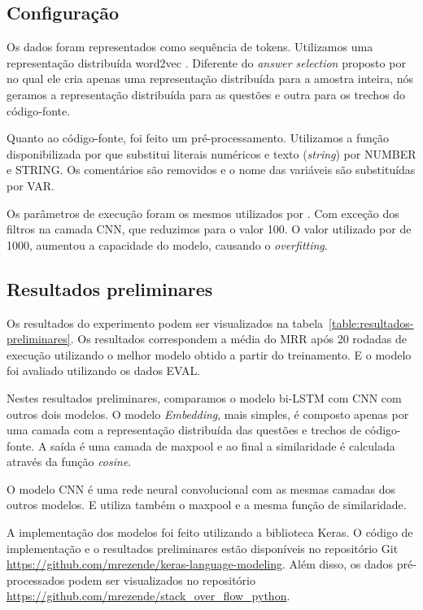 \documentclass[12pt]{article}
\begin{document}
\subsection{Configuração}

Os dados foram representados como sequência de tokens. Utilizamos uma representação distribuída word2vec \cite{mikolov-word2vec-2013}. Diferente do \textit{answer selection} proposto por \cite{tan-lstm-qa} no qual ele cria apenas uma representação distribuída para a amostra inteira, nós geramos a representação distribuída para as questões e outra para os trechos do código-fonte.

Quanto ao código-fonte, foi feito um pré-processamento. Utilizamos a função disponibilizada por \cite{Yao-staqc:2018} que substitui literais numéricos e texto (\textit{string}) por NUMBER e STRING. Os comentários são removidos e o nome das variáveis são substituídas por VAR.

Os parâmetros de execução foram os mesmos utilizados por \cite{tan-lstm-qa}. Com exceção dos filtros na camada CNN, que reduzimos para o valor 100. O valor utilizado por \cite{tan-lstm-qa} de 1000, aumentou a capacidade do modelo, causando o \textit{overfitting}.




\subsection{Resultados preliminares}\label{sec:resultados-preliminares}

Os resultados do experimento podem ser visualizados na tabela~\ref{table:resultados-preliminares}. Os resultados correspondem a média do MRR após 20 rodadas de execução utilizando o melhor modelo obtido a partir do treinamento. E o modelo foi avaliado utilizando os dados EVAL. 

Nestes resultados preliminares, comparamos o modelo bi-LSTM com CNN com outros dois modelos. O modelo \emph{Embedding}, mais simples, é composto apenas por uma camada com a representação distribuída das questões e trechos de código-fonte. A saída é uma camada de maxpool e ao final a similaridade é calculada através da função \textit{cosine}. 

O modelo CNN é uma rede neural convolucional com as mesmas camadas dos outros modelos. E utiliza também o maxpool e a mesma função de similaridade.

A implementação dos modelos foi feito utilizando a biblioteca Keras. O código de implementação e o resultados preliminares estão disponíveis no repositório Git \url{https://github.com/mrezende/keras-language-modeling}. Além disso, os dados pré-processados podem ser visualizados no repositório \url{https://github.com/mrezende/stack_over_flow_python}.
\end{document}
